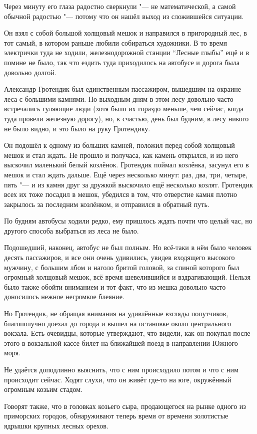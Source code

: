 Через минуту его глаза радостно сверкнули "--- не математической, а самой
обычной радостью "--- потому что он нашёл выход из сложившейся ситуации.

Он взял с собой большой холщовый мешок и направился в пригородный лес, в тот
самый, в котором раньше любили собираться художники.
В то время электрички туда не ходили, железнодорожной станции \enquote{Лесные
глыбы} ещё и в помине не было, так что ездить туда приходилось на автобусе и
дорога была довольно долгой.

Александр Гротендик был единственным пассажиром, вышедшим на окраине леса с
большими камнями.
По выходным дням в этом лесу довольно часто встречались гуляющие люди (хотя было
их гораздо меньше, чем сейчас, когда туда провели железную дорогу), но, к
счастью, день был будним, в лесу никого не было видно, и это было на руку
Гротендику.

Он подошёл к одному из больших камней, положил перед собой холщовый мешок и стал
ждать.
Не прошло и получаса, как камень открылся, и из него выскочил маленький белый
козлёнок.
Гротендик поймал козлёнка, засунул его в мешок и стал ждать дальше.
Ещё через несколько минут: раз, два, три, четыре, пять "--- и из камня друг за
дружкой выскочило ещё несколько козлят.
Гротендик всех их тоже посадил в мешок, убедился в том, что отверстие камня
плотно закрылось за последним козлёнком, и отправился в обратный путь.

По будням автобусы ходили редко, ему пришлось ждать почти что целый час, но
другого способа выбраться из леса не было.

Подошедший, наконец, автобус не был полным.
Но всё-таки в нём было человек десять пассажиров, и все они очень удивились,
увидев входящего высокого мужчину, с большим лбом и наголо бритой головой, за
спиной которого был огромный холщовый мешок, всё время шевелившийся и
вздрагивающий.
Нельзя было также обойти вниманием и тот факт, что из мешка довольно часто
доносилось нежное негромкое блеяние.

Но Гротендик, не обращая внимания на удивлённые взгляды попутчиков, благополучно
доехал до города и вышел на остановке около центрального вокзала.
Есть очевидцы, которые утверждают, что видели, как он покупал после этого в
вокзальной кассе билет на ближайшей поезд в направлении Южного моря.

Не удаётся доподлинно выяснить, что с ним происходило потом и что с ним
происходит сейчас.
Ходят слухи, что он живёт где-то на юге, окружённый огромным козьим стадом.

Говорят также, что в головках козьего сыра, продающегося на рынке одного из
приморских городов, обнаруживают теперь время от времени золотистые ядрышки
крупных лесных орехов.
